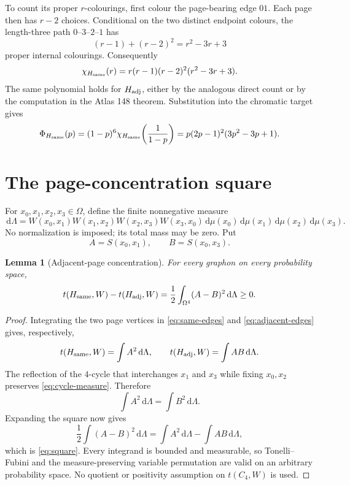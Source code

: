 \documentclass[11pt]{article}
\newtheorem{lemma}[theorem]{Lemma}
\newcommand{\dd}{\,\mathrm d}
\begin{document}
To count its proper $r$-colourings, first colour the page-bearing edge $01$.
Each page then has $r-2$ choices.  Conditional on the two distinct endpoint
colours, the length-three path $0$--$3$--$2$--$1$ has
\[
 (r-1)+(r-2)^2=r^2-3r+3
\]
proper internal colourings.  Consequently
\begin{equation}
 \chi_{H_{\rm same}}(r)
 =r(r-1)(r-2)^2(r^2-3r+3).
 \label{eq:chromatic}
\end{equation}
The same polynomial holds for $H_{\rm adj}$, either by the analogous direct
count or by the computation in the Atlas 148 theorem.  Substitution into the
chromatic target gives
\begin{equation}
 \Phi_{H_{\rm same}}(p)
 =(1-p)^6\chi_{H_{\rm same}}\!\left(\frac1{1-p}\right)
 =p(2p-1)^2(3p^2-3p+1).
 \label{eq:target}
\end{equation}


\section{The page-concentration square}

For $x_0,x_1,x_2,x_3\in\Omega$, define the finite nonnegative measure
\begin{equation}
 \dd\Lambda
 =W(x_0,x_1)W(x_1,x_2)W(x_2,x_3)W(x_3,x_0)
   \dd\mu(x_0)\dd\mu(x_1)\dd\mu(x_2)\dd\mu(x_3).
 \label{eq:cycle-measure}
\end{equation}
No normalization is imposed; its total mass may be zero.  Put
\[
 A=S(x_0,x_1),\qquad B=S(x_0,x_3).
\]

\begin{lemma}[Adjacent-page concentration]
\label{lem:concentration}
For every graphon on every probability space,
\begin{equation}
 t(H_{\rm same},W)-t(H_{\rm adj},W)
 =\frac12\int_{\Omega^4}(A-B)^2\dd\Lambda\geq0.
 \label{eq:square}
\end{equation}
\end{lemma}

\begin{proof}
Integrating the two page vertices in \eqref{eq:same-edges} and
\eqref{eq:adjacent-edges} gives, respectively,
\[
 t(H_{\rm same},W)=\int A^2\dd\Lambda,
 \qquad
 t(H_{\rm adj},W)=\int AB\dd\Lambda.
\]
The reflection of the $4$-cycle that interchanges $x_1$ and $x_3$ while
fixing $x_0,x_2$ preserves \eqref{eq:cycle-measure}.  Therefore
\[
 \int A^2\dd\Lambda=\int B^2\dd\Lambda.
\]
Expanding the square now gives
\[
 \frac12\int(A-B)^2\dd\Lambda
 =\int A^2\dd\Lambda-\int AB\dd\Lambda,
\]
which is \eqref{eq:square}.  Every integrand is bounded and measurable, so
Tonelli--Fubini and the measure-preserving variable permutation are valid on
an arbitrary probability space.  No quotient or positivity assumption on
$t(C_4,W)$ is used.
\end{proof}
\end{document}
